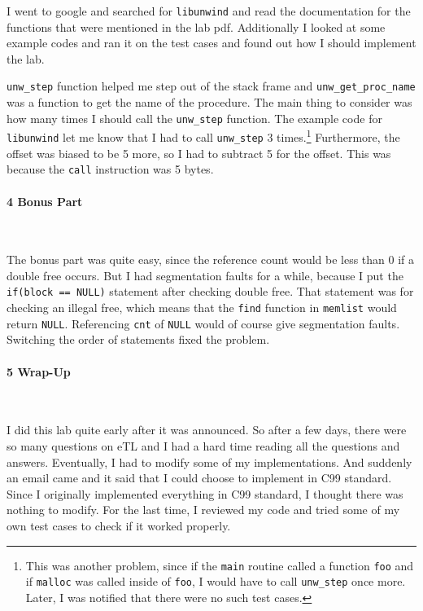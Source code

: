 \documentclass[12pt]{report}
\begin{document}
I went to google and searched for \texttt{libunwind} and read the documentation for the functions that were mentioned in the lab pdf. Additionally I looked at some example codes and ran it on the test cases and found out how I should implement the lab.

\texttt{unw\_step} function helped me step out of the stack frame and \texttt{unw\_get\_proc\_name} was a function to get the name of the procedure. The main thing to consider was how many times I should call the \texttt{unw\_step} function. The example code for \texttt{libunwind} let me know that I had to call \texttt{unw\_step} 3 times.\footnote{This was another problem, since if the \texttt{main} routine called a function \texttt{foo} and if \texttt{malloc} was called inside of \texttt{foo}, I would have to call \texttt{unw\_step} once more. Later, I was notified that there were no such test cases.}
Furthermore, the offset was biased to be 5 more, so I had to subtract 5 for the offset. This was because the \texttt{call} instruction was 5 bytes.

\paragraph*{\large 4 Bonus Part}~

The bonus part was quite easy, since the reference count would be less than 0 if a double free occurs. But I had segmentation faults for a while, because I put the \texttt{if(block == NULL)} statement after checking double free. That statement was for checking an illegal free, which means that the \texttt{find} function in \texttt{memlist} would return \texttt{NULL}. Referencing \texttt{cnt} of \texttt{NULL} would of course give segmentation faults. Switching the order of statements fixed the problem.\\

\paragraph*{\large 5 Wrap-Up}~

I did this lab quite early after it was announced. So after a few days, there were so many questions on eTL and I had a hard time reading all the questions and answers. Eventually, I had to modify some of my implementations. And suddenly an email came and it said that I could choose to implement in C99 standard. Since I originally implemented everything in C99 standard, I thought there was nothing to modify. For the last time, I reviewed my code and tried some of my own test cases to check if it worked properly.
\end{document}
